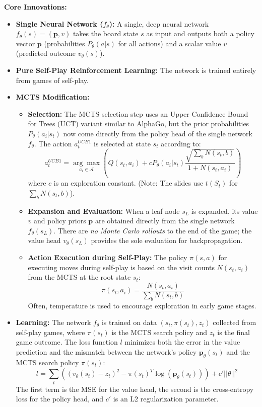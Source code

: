 \documentclass[11pt,a4paper]{article}
\begin{document}
\textbf{Core Innovations:}
\begin{itemize}
    \item \textbf{Single Neural Network ($f_{\theta}$):} A single, deep neural network $f_{\theta}(s) = (\mathbf{p}, v)$ takes the board state $s$ as input and outputs both a policy vector $\mathbf{p}$ (probabilities $P_{\theta}(a|s)$ for all actions) and a scalar value $v$ (predicted outcome $v_{\theta}(s)$).
    \item \textbf{Pure Self-Play Reinforcement Learning:} The network is trained entirely from games of self-play.
    \item \textbf{MCTS Modification:}
    \begin{itemize}
        \item \textbf{Selection:} The MCTS selection step uses an Upper Confidence Bound for Trees (UCT) variant similar to AlphaGo, but the prior probabilities $P_{\theta}(a_i|s_t)$ now come directly from the policy head of the single network $f_{\theta}$. The action $a_t^{UCB1}$ is selected at state $s_t$ according to:
        \begin{equation}
            a_t^{UCB1} = \underset{a_i \in \mathcal{A}}{\arg\max} \left( Q(s_t, a_i) + c P_{\theta}(a_i|s_t) \frac{\sqrt{\sum_b N(s_t, b)}}{1 + N(s_t, a_i)} \right)
        \end{equation}
        where $c$ is an exploration constant. (Note: The slides use $t(S_t)$ for $\sum_b N(s_t, b)$).
        \item \textbf{Expansion and Evaluation:} When a leaf node $s_L$ is expanded, its value $v$ and policy priors $\mathbf{p}$ are obtained directly from the single network $f_{\theta}(s_L)$. There are \textit{no Monte Carlo rollouts} to the end of the game; the value head $v_{\theta}(s_L)$ provides the sole evaluation for backpropagation.
        \item \textbf{Action Execution during Self-Play:} The policy $\pi(s,a)$ for executing moves during self-play is based on the visit counts $N(s_t, a_i)$ from the MCTS at the root state $s_t$:
        \begin{equation}
            \pi(s_t, a_i) = \frac{N(s_t, a_i)}{\sum_b N(s_t, b)}
        \end{equation}
        Often, temperature is used to encourage exploration in early game stages.
    \end{itemize}
    \item \textbf{Learning:} The network $f_{\theta}$ is trained on data $(s_t, \pi(s_t), z_t)$ collected from self-play games, where $\pi(s_t)$ is the MCTS search policy and $z_t$ is the final game outcome. The loss function $l$ minimizes both the error in the value prediction and the mismatch between the network's policy $\mathbf{p}_{\theta}(s_t)$ and the MCTS search policy $\pi(s_t)$:
    \begin{equation}
        l = \sum_t \left( (v_{\theta}(s_t) - z_t)^2 - \pi(s_t)^T \log(\mathbf{p}_{\theta}(s_t)) \right) + c' ||\theta||^2
    \end{equation}
    The first term is the MSE for the value head, the second is the cross-entropy loss for the policy head, and $c'$ is an L2 regularization parameter.
\end{itemize}
\end{document}

